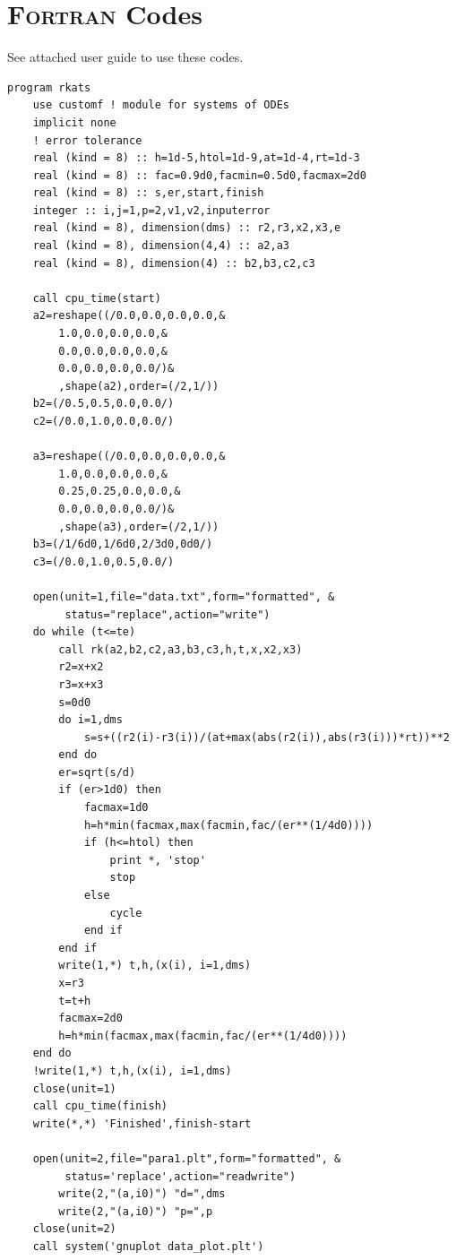 \documentclass[a4paper,oneside]{book}
\numberwithin{equation}{chapter}
\begin{document}
\section{\textsc{Fortran} Codes}
See attached user guide to use these codes.
\begin{lstlisting}
program rkats
	use customf ! module for systems of ODEs
	implicit none
    ! error tolerance
	real (kind = 8) :: h=1d-5,htol=1d-9,at=1d-4,rt=1d-3 
	real (kind = 8) :: fac=0.9d0,facmin=0.5d0,facmax=2d0
	real (kind = 8) :: s,er,start,finish
	integer :: i,j=1,p=2,v1,v2,inputerror
	real (kind = 8), dimension(dms) :: r2,r3,x2,x3,e
	real (kind = 8), dimension(4,4) :: a2,a3
	real (kind = 8), dimension(4) :: b2,b3,c2,c3
	
	call cpu_time(start)
	a2=reshape((/0.0,0.0,0.0,0.0,&
		1.0,0.0,0.0,0.0,&
		0.0,0.0,0.0,0.0,&
		0.0,0.0,0.0,0.0/)&
		,shape(a2),order=(/2,1/))
	b2=(/0.5,0.5,0.0,0.0/)
	c2=(/0.0,1.0,0.0,0.0/)

	a3=reshape((/0.0,0.0,0.0,0.0,&
		1.0,0.0,0.0,0.0,&
		0.25,0.25,0.0,0.0,&
		0.0,0.0,0.0,0.0/)&
		,shape(a3),order=(/2,1/))
	b3=(/1/6d0,1/6d0,2/3d0,0d0/)
	c3=(/0.0,1.0,0.5,0.0/)

	open(unit=1,file="data.txt",form="formatted", &
	     status="replace",action="write")
	do while (t<=te)
		call rk(a2,b2,c2,a3,b3,c3,h,t,x,x2,x3)
		r2=x+x2
		r3=x+x3
		s=0d0
		do i=1,dms
			s=s+((r2(i)-r3(i))/(at+max(abs(r2(i)),abs(r3(i)))*rt))**2
		end do
		er=sqrt(s/d)
		if (er>1d0) then
			facmax=1d0
			h=h*min(facmax,max(facmin,fac/(er**(1/4d0))))
			if (h<=htol) then
				print *, 'stop'
				stop
			else 
				cycle
			end if
		end if
		write(1,*) t,h,(x(i), i=1,dms)
		x=r3
		t=t+h
		facmax=2d0
		h=h*min(facmax,max(facmin,fac/(er**(1/4d0))))
	end do
	!write(1,*) t,h,(x(i), i=1,dms)
	close(unit=1)
	call cpu_time(finish)
	write(*,*) 'Finished',finish-start
	
	open(unit=2,file="para1.plt",form="formatted", &
	     status='replace',action="readwrite")
		write(2,"(a,i0)") "d=",dms
		write(2,"(a,i0)") "p=",p
	close(unit=2)
	call system('gnuplot data_plot.plt')
	

\end{lstlisting}
\end{document}
